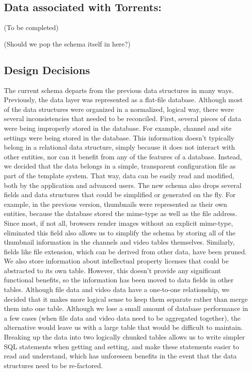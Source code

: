 \documentclass[a4paper,12pt]{report}
\begin{document}
\subsection{Data associated with Torrents:}
(To be completed)

(Should we pop the schema itself in here?)

\subsection{Design Decisions}
	The current schema departs from the previous data structures in many ways. Previously, the data layer was represented as a flat-file database. Although most of the data structures were organized in a normalized, logical way, there were several inconsistencies that needed to be reconciled.
	First, several pieces of data were being improperly stored in the database. For example, channel and site settings were being stored in the database. This information doesn't typically belong in a relational data structure, simply because it does not interact with other entities, nor can it benefit from any of the features of a database. Instead, we decided that the data belongs in a simple, transparent configuration file as part of the template system. That way, data can be easily read and modified, both by the application and advanced users. 
	The new schema also drops several fields and data structures that could be simplified or generated on the fly. For example, in the previous version, thumbnails were represented as their own entities, because the database stored the mime-type as well as the file address. Since most, if not all, browsers render images without an explicit mime-type, eliminated this field also allows us to simplify the schema by storing all of the thumbnail information in the channels and video tables themselves. Similarly, fields like file extension, which can be derived from other data, have been pruned. We also store information about intellectual property licenses that could be abstracted to its own table. However, this doesn't provide any significant functional benefits, so the information has been moved to data fields in other tables.
	Although file data and video data have a one-to-one relationship, we decided that it makes more logical sense to keep them separate rather than merge them into one table. Although we lose a small amount of database performance in a few cases (when file data and video data need to be aggregated together), the alternative would leave us with a large table that would be difficult to maintain. Breaking up the data into two logically chunked tables allows us to write simpler SQL statements when getting and setting, and make these statements easier to read and understand, which has unforeseen benefits in the event that the data structures need to be re-factored.
\end{document}
